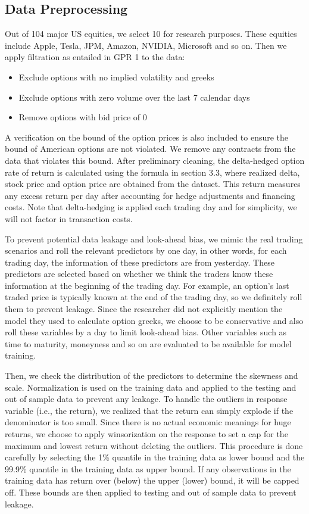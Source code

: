 \documentclass[oneside, 12pt]{article}
\newcommand*{\1}{\text{\scalebox{1.1}{\usefont{U}{bbold}{m}{n}1}}}
\begin{document}
\subsection{Data Preprocessing}
Out of 104 major US equities, we select 10 for research purposes. These equities include Apple, Tesla, JPM, Amazon, NVIDIA, Microsoft and so on. Then we apply filtration as entailed in GPR 1 to the data:
\begin{itemize}
\item Exclude options with no implied volatility and greeks 
\item Exclude options with zero volume over the last 7 calendar days
\item Remove options with bid price of 0
\end{itemize}
A verification on the bound of the option prices is also included to ensure the bound of American options are not violated. We remove any contracts from the data that violates this bound. After preliminary cleaning, the delta-hedged option rate of return is calculated using the formula in section 3.3, where realized delta, stock price and option price are obtained from the dataset. This return measures any excess return per day after accounting for hedge adjustments and financing costs. Note that delta-hedging is applied each trading day and for simplicity, we will not factor in transaction costs. \newline

To prevent potential data leakage and look-ahead bias, we mimic the real trading scenarios and roll the relevant predictors by one day, in other words, for each trading day, the information of these predictors are from yesterday. These predictors are selected based on whether we think the traders know these information at the beginning of the trading day. For example, an option's last traded price is typically known at the end of the trading day, so we definitely roll them to prevent leakage. Since the researcher did not explicitly mention the model they used to calculate option greeks, we choose to be conservative and also roll these variables by a day to limit look-ahead bias. Other variables such as time to maturity, moneyness and so on are evaluated to be available for model training. \newline

Then, we check the distribution of the predictors to determine the skewness and scale. Normalization is used on the training data and applied to the testing and out of sample data to prevent any leakage. To handle the outliers in response variable (i.e., the return), we realized that the return can simply explode if the denominator is too small. Since there is no actual economic meanings for huge returns, we choose to apply winsorization on the response to set a cap for the maximum and lowest return without deleting the outliers. This procedure is done carefully by selecting the 1\% quantile in the training data as lower bound and the 99.9\% quantile in the training data as upper bound. If any observations in the training data has return over (below) the upper (lower) bound, it will be capped off. These bounds are then applied to testing and out of sample data to prevent leakage. 
\end{document}
